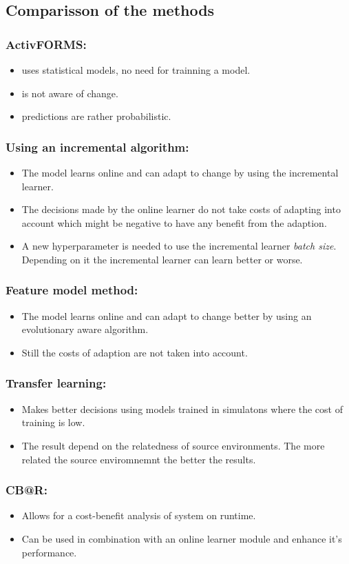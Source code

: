 \documentclass[pdftex,english,oribibl]{llncs}
\begin{document}
\subsection {Comparisson of the methods}
\subsubsection{ActivFORMS: \\}
\begin{itemize}
\item uses statistical models, no need for trainning a model.
\item is not aware of change.
\item predictions are rather probabilistic.
\end{itemize}
\subsubsection{Using an incremental algorithm: \\}
\begin{itemize}
\item The model learns online and can adapt to change by using the incremental learner.
\item The decisions made by the online learner do not take costs of adapting into account which might be negative to have any benefit from the adaption.
\item A new hyperparameter is needed to use the incremental learner \textit{batch size}. Depending on it the incremental learner can learn better or worse.
\end{itemize}
\subsubsection{Feature model method: \\}
\begin{itemize}
\item The model learns online and can adapt to change better by using an evolutionary aware algorithm.
\item Still the costs of adaption are not taken into account.
\end{itemize}
\subsubsection{Transfer learning: \\}
\begin{itemize}
\item Makes better decisions using models trained in simulatons where the cost of training is low. 
\item The result depend on the relatedness of source environments. The more related the source enviromnemnt the better the results. 
\end{itemize}
\subsubsection{CB@R: \\}
\begin{itemize}
\item Allows for a cost-benefit analysis of system on runtime. 
\item Can be used in combination with an online learner module and enhance it's performance. 
\end{itemize}
\nocite{*}

\end{document}
